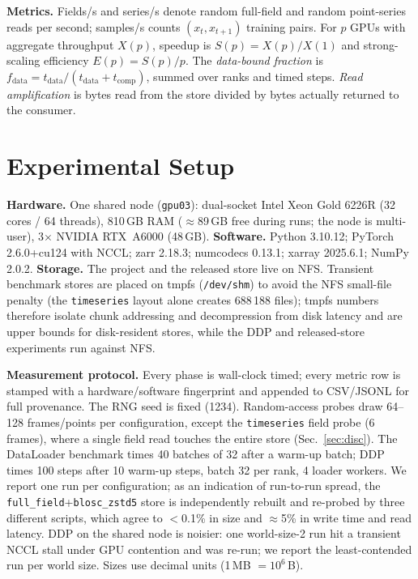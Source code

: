 \documentclass[conference]{IEEEtran}
\begin{document}
\textbf{Metrics.} Fields/s and series/s denote random full-field and random
point-series reads per second; samples/s counts $(x_t,x_{t+1})$ training
pairs. For $p$ GPUs with aggregate throughput $X(p)$, speedup is
$S(p)=X(p)/X(1)$ and strong-scaling efficiency $E(p)=S(p)/p$. The
\emph{data-bound fraction} is
$f_{\mathrm{data}}=t_{\mathrm{data}}/(t_{\mathrm{data}}+t_{\mathrm{comp}})$,
summed over ranks and timed steps. \emph{Read amplification} is bytes read
from the store divided by bytes actually returned to the consumer.

\section{Experimental Setup}
\textbf{Hardware.} One shared node (\texttt{gpu03}): dual-socket Intel Xeon
Gold 6226R (32 cores / 64 threads), 810\,GB RAM ($\approx$89\,GB free during
runs; the node is multi-user), 3$\times$ NVIDIA RTX~A6000 (48\,GB).
\textbf{Software.} Python 3.10.12; PyTorch 2.6.0+cu124 with NCCL; zarr 2.18.3;
numcodecs 0.13.1; xarray 2025.6.1; NumPy 2.0.2. \textbf{Storage.} The project
and the released store live on NFS. Transient benchmark stores are placed on
tmpfs (\texttt{/dev/shm}) to avoid the NFS small-file penalty (the
\texttt{timeseries} layout alone creates 688\,188 files); tmpfs numbers
therefore isolate chunk addressing and decompression from disk latency and are
upper bounds for disk-resident stores, while the DDP and released-store
experiments run against NFS.

\textbf{Measurement protocol.} Every phase is wall-clock timed; every metric
row is stamped with a hardware/software fingerprint and appended to CSV/JSONL
for full provenance. The RNG seed is fixed (1234). Random-access probes draw
64--128 frames/points per configuration, except the \texttt{timeseries}
field probe (6 frames), where a single field read touches the entire store
(Sec.~\ref{sec:disc}). The DataLoader benchmark times 40 batches of 32 after a
warm-up batch; DDP times 100 steps after 10 warm-up steps, batch 32 per rank,
4 loader workers. We report one run per configuration; as an indication of
run-to-run spread, the \texttt{full\_field}+\texttt{blosc\_zstd5} store is
independently rebuilt and re-probed by three different scripts, which agree to
$<$0.1\% in size and $\approx$5\% in write time and read latency. DDP on the
shared node is noisier: one world-size-2 run hit a transient NCCL stall under
GPU contention and was re-run; we report the least-contended run per world
size. Sizes use decimal units (1\,MB $=10^6$\,B).
\end{document}
